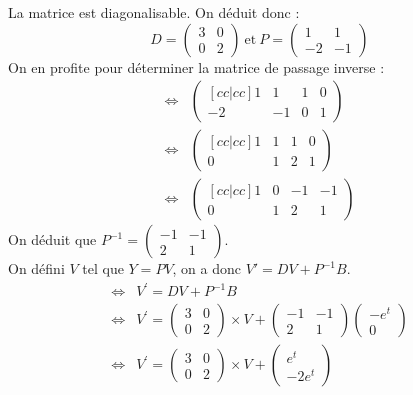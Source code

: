 \begin{ex}
La matrice est diagonalisable. On déduit donc :\\
$$D=\begin{pmatrix}3&0\\0&2\end{pmatrix}\ \text{et}\ P=\begin{pmatrix}1&1\\-2&-1\end{pmatrix}$$
On en profite pour déterminer la matrice de passage inverse :
\begin{align*}
    \Leftrightarrow & \begin{pmatrix}[cc|cc]
   1 & 1 & 1 & 0 \\  
   -2 & -1 & 0 & 1
 \end{pmatrix}\\
 \Leftrightarrow & \begin{pmatrix}[cc|cc]1 & 1 & 1 & 0\\
 0&1&2&1\end{pmatrix}\\
 \Leftrightarrow & \begin{pmatrix}[cc|cc]1&0&-1&-1\\0&1&2&1\end{pmatrix}
\end{align*}
On déduit que $P^{-1}=\begin{pmatrix}-1&-1\\2&1\end{pmatrix}$.\\
On défini $V$ tel que $Y=PV$, on a donc $V'=DV+P^{-1}B$.\\
\begin{align*}
    \Leftrightarrow & V^{\prime}=DV+P^{-1}B \\
    \Leftrightarrow & V^{\prime}=\begin{pmatrix}3&0\\0&2\end{pmatrix}\times V +\begin{pmatrix}-1&-1\\2&1\end{pmatrix}\begin{pmatrix}-e^t\\0\end{pmatrix}\\
    \Leftrightarrow & V^{\prime}=\begin{pmatrix}3&0\\0&2\end{pmatrix}\times V +\begin{pmatrix}e^t\\-2e^t\end{pmatrix}\\

\end{align*}
\end{ex}
